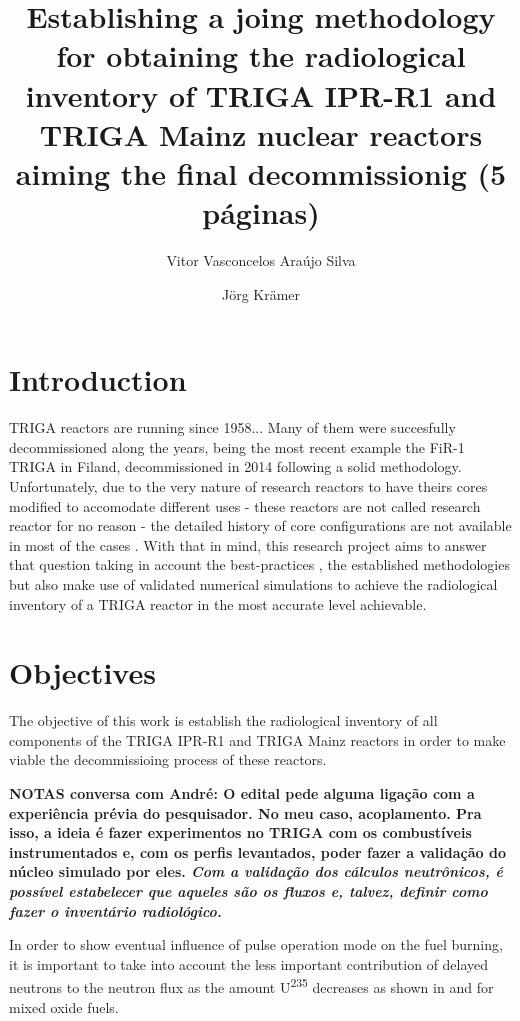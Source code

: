 \documentclass[11pt]{article} %
\title{Establishing a joing methodology for obtaining the radiological inventory of TRIGA IPR-R1 and TRIGA Mainz nuclear reactors aiming the final decommissionig (5 páginas)}
\author[1]{Vitor Vasconcelos Araújo Silva}
\author[2]{Jörg Krämer}
\affil[1]{Centro de Desenvolvimento da Tecnologia Nuclear - CDTN/CNEN}
\affil[2]{Universität Johannes Gutenberg Mainz}
\date{} %
\begin{document}
\maketitle

\section{Introduction}

TRIGA reactors are running since 1958...
Many of them were succesfully decommissioned along the years, being the most recent example the FiR-1 TRIGA in Filand, decommissioned in 2014 \cite{Raty_Thesis_2020} following a solid methodology. Unfortunately, due to the very nature of research reactors to have theirs cores modified to accomodate different uses - these reactors are not called research reactor for no reason - the detailed history of core configurations are not available in most of the cases \cite[p. xxx]{Clean-up_CEA-e-DEN_2018}. With that in mind, this research project aims to answer that question taking in account the best-practices \cite{AIEA}, the established methodologies \cite{Raty_paper} but also make use of validated numerical simulations to achieve the radiological inventory of a TRIGA reactor in the most accurate level achievable.



\section{Objectives}

The objective of this work is establish the radiological inventory of all components of the TRIGA IPR-R1 and TRIGA Mainz reactors in order to make viable the decommissioing process of these reactors.

\textbf{NOTAS conversa com André: O edital pede alguma ligação com a experiência prévia do pesquisador. No meu caso, acoplamento. Pra isso, a ideia é fazer experimentos no TRIGA com os combustíveis instrumentados e, com os perfis levantados, poder fazer a validação do núcleo simulado por eles. \textit{Com a validação dos cálculos neutrônicos, é possível estabelecer que aqueles são os fluxos e, talvez, definir como fazer o inventário radiológico.}}

In order to show eventual influence of pulse operation mode on the fuel burning, it is important to take into account the less important contribution of delayed neutrons to the neutron flux as the amount U\textsuperscript{235} decreases as shown in \cite{Carvalho_2024} and \cite{Carvalho_2025} for mixed oxide fuels.
\end{document}
